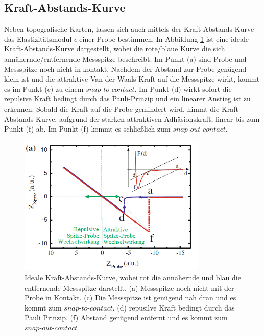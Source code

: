 \subsection{Kraft-Abstands-Kurve}
\label{sec:Kraft-Abstand}

Neben topografische Karten, lassen sich auch mittels der Kraft-Abstands-Kurve das
Elastizitätsmodul $\epsilon$ einer Probe bestimmen. In Abbildung \ref{fig:Kraft-Abstand}
ist eine ideale Kraft-Abstands-Kurve dargestellt, wobei die rote/blaue Kurve die
sich annähernde/entfernende Messspitze beschreibt. Im Punkt (a) sind Probe und
Messspitze noch nicht in kontakt. Nachdem der Abstand zur Probe genügend klein
ist und die attraktive Van-der-Waals-Kraft auf die Messspitze wirkt, kommt es im
Punkt (c) zu einem $\textit{snap-to-contact}$. Im Punkt (d) wirkt sofort die repulsive
Kraft bedingt durch das Pauli-Prinzip und ein linearer Anstieg ist zu erkennen.
Sobald die Kraft auf die Probe gemindert wird, nimmt die Kraft-Abstands-Kurve,
aufgrund der starken attraktiven Adhäsionskraft, linear bis zum Punkt (f) ab.
Im Punkt (f) kommt es schließlich zum $\textit{snap-out-contact}$.

\begin{figure}[H]
	\centering
	\includegraphics[width=0.8\textwidth]{Abb/Kraft-Abstands-Kurve.png}
	\caption{Ideale Kraft-Abstands-Kurve, wobei rot die annähernde und blau die
	entfernende Messspitze darstellt. (a) Messspitze noch nicht mit der Probe in
	Kontakt. (c) Die Messspitze ist genügend nah dran und es kommt zum
$\textit{snap-to-contact}$. (d) repusilve Kraft bedingt durch das Pauli Prinzip.
	(f) Abstand genügend entfernt und es kommt zum $\textit{snap-out-contact}$
	\cite[184]{AFM}}
	\label{fig:Kraft-Abstand}
\end{figure}

